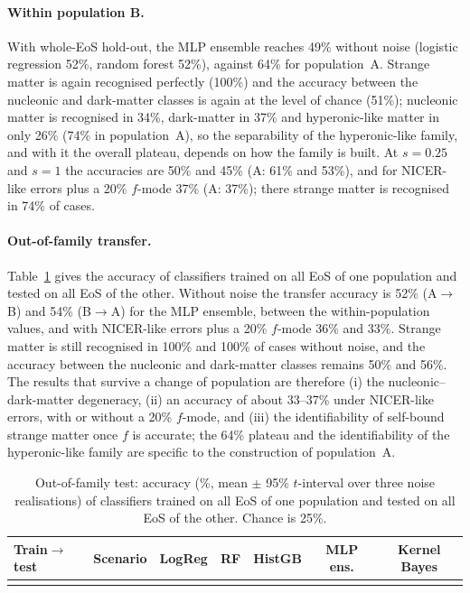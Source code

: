\documentclass[11pt,a4paper]{article}
\begin{document}
\paragraph{Within population B.} With whole-EoS hold-out, the MLP ensemble reaches 49\% without noise (logistic regression 52\%, random forest 52\%), against 64\% for population~A. Strange matter is again recognised perfectly (100\%) and the accuracy between the nucleonic and dark-matter classes is again at the level of chance (51\%); nucleonic matter is recognised in 34\%, dark-matter in 37\% and hyperonic-like matter in only 26\% (74\% in population~A), so the separability of the hyperonic-like family, and with it the overall plateau, depends on how the family is built. At $s=0.25$ and $s=1$ the accuracies are 50\% and 45\% (A: 61\% and 53\%), and for NICER-like errors plus a 20\% $f$-mode 37\% (A: 37\%); there strange matter is recognised in 74\% of cases.
\paragraph{Out-of-family transfer.} Table~\ref{tab:cross} gives the accuracy of classifiers trained on all EoS of one population and tested on all EoS of the other. Without noise the transfer accuracy is 52\% (A$\to$B) and 54\% (B$\to$A) for the MLP ensemble, between the within-population values, and with NICER-like errors plus a 20\% $f$-mode 36\% and 33\%. Strange matter is still recognised in 100\% and 100\% of cases without noise, and the accuracy between the nucleonic and dark-matter classes remains 50\% and 56\%. The results that survive a change of population are therefore (i) the nucleonic--dark-matter degeneracy, (ii) an accuracy of about 33--37\% under NICER-like errors, with or without a 20\% $f$-mode, and (iii) the identifiability of self-bound strange matter once $f$ is accurate; the 64\% plateau and the identifiability of the hyperonic-like family are specific to the construction of population~A.
\begin{table}[t]\centering\small
\caption{Out-of-family test: accuracy (\%, mean $\pm$ 95\% $t$-interval over three noise realisations) of classifiers trained on all EoS of one population and tested on all EoS of the other. Chance is 25\%.}\label{tab:cross}
\begin{tabular}{llccccc}\toprule
Train$\to$test & Scenario & LogReg & RF & HistGB & MLP ens. & Kernel Bayes\\\midrule\\\bottomrule\end{tabular}\end{table}
\end{document}
